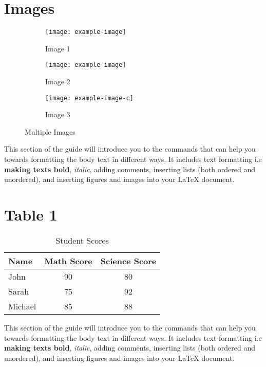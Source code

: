\documentclass{article}
\begin{document}
\section{Images}
\begin{figure}[!htb]
\centering
\begin{subfigure}[b]{0.3\textwidth}
    \texttt{[image: example-image]}
    \caption{Image 1}
    \label{fig:image1}
\end{subfigure}
\hfill
\begin{subfigure}[b]{0.3\textwidth}
    \texttt{[image: example-image]}
    \caption{Image 2}
    \label{fig:image2}
\end{subfigure}
\hfill
\begin{subfigure}[b]{0.3\textwidth}
    \texttt{[image: example-image-c]}
    \caption{Image 3}
    \label{fig:image3}
\end{subfigure}
\caption{Multiple Images}
\label{fig:multiple_images}
\end{figure}
This section of the guide will introduce you to the commands that can help you towards formatting the body text in different ways. It includes text formatting i.e \textbf{making texts bold}, \textit{italic}, adding comments, inserting lists (both ordered and unordered), and inserting figures and images into your \LaTeX{} document.

\section{Table 1}

\begin{table}[ht]
\centering
\caption{Student Scores}
\label{tab:student_scores}
\begin{tabular}{|l|c|c|}
\hline
\textbf{Name} & \textbf{Math Score} & \textbf{Science Score} \\
\hline
John & 90 & 80 \\
\hline
Sarah & 75 & 92 \\
\hline
Michael & 85 & 88 \\
\hline
\end{tabular}
\end{table}
This section of the guide will introduce you to the commands that can help you towards formatting the body text in different ways. It includes text formatting i.e \textbf{making texts bold}, \textit{italic}, adding comments, inserting lists (both ordered and unordered), and inserting figures and images into your \LaTeX{} document.
\end{document}
